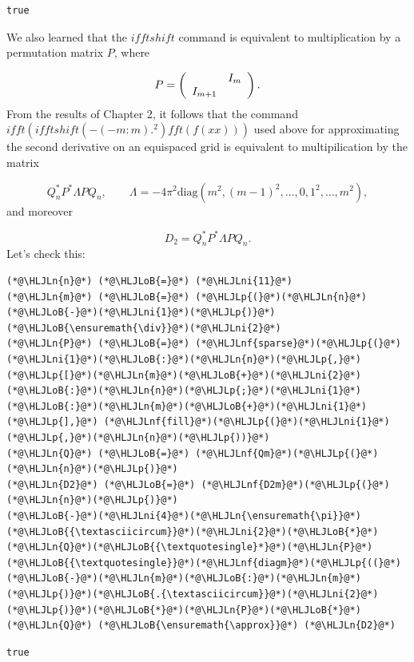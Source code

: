 \documentclass[12pt,a4paper]{article}
\newcommand{\HLJLn}[1]{#1}
\newcommand{\HLJLnf}[1]{\textcolor[RGB]{66,102,213}{#1}}
\newcommand{\HLJLni}[1]{\textcolor[RGB]{59,151,46}{#1}}
\newcommand{\HLJLoB}[1]{\textcolor[RGB]{102,102,102}{\textbf{#1}}}
\newcommand{\HLJLp}[1]{#1}
\begin{document}
\begin{lstlisting}
true
\end{lstlisting}


We also learned that the $ifftshift$ command is equivalent to multiplication by a permutation matrix $P$, where

\[
P = \left(
\begin{array}{c c}
   & I_{m} \\
I_{m+1} & 
\end{array}
\right).
\]
From the results of Chapter 2, it follows that the command $ifft(ifftshift(-(-m:m).^2)fft(f(xx)))$ used above for approximating the second derivative on an equispaced grid is equivalent to multipilication by the matrix

\[
Q_n^*P^*\Lambda PQ_n, \qquad \Lambda = -4\pi^2\mathrm{diag}(m^2, (m-1)^2, \ldots, 0, 1^2, \ldots, m^2),
\]
and moreover

\[
D_2 = Q_n^*P^*\Lambda PQ_n.
\]
Let's check this:


\begin{lstlisting}
(*@\HLJLn{n}@*) (*@\HLJLoB{=}@*) (*@\HLJLni{11}@*)
(*@\HLJLn{m}@*) (*@\HLJLoB{=}@*) (*@\HLJLp{(}@*)(*@\HLJLn{n}@*)(*@\HLJLoB{-}@*)(*@\HLJLni{1}@*)(*@\HLJLp{)}@*)(*@\HLJLoB{\ensuremath{\div}}@*)(*@\HLJLni{2}@*)
(*@\HLJLn{P}@*) (*@\HLJLoB{=}@*) (*@\HLJLnf{sparse}@*)(*@\HLJLp{(}@*)(*@\HLJLni{1}@*)(*@\HLJLoB{:}@*)(*@\HLJLn{n}@*)(*@\HLJLp{,}@*) (*@\HLJLp{[}@*)(*@\HLJLn{m}@*)(*@\HLJLoB{+}@*)(*@\HLJLni{2}@*)(*@\HLJLoB{:}@*)(*@\HLJLn{n}@*)(*@\HLJLp{;}@*)(*@\HLJLni{1}@*)(*@\HLJLoB{:}@*)(*@\HLJLn{m}@*)(*@\HLJLoB{+}@*)(*@\HLJLni{1}@*)(*@\HLJLp{],}@*) (*@\HLJLnf{fill}@*)(*@\HLJLp{(}@*)(*@\HLJLni{1}@*)(*@\HLJLp{,}@*)(*@\HLJLn{n}@*)(*@\HLJLp{))}@*)
(*@\HLJLn{Q}@*) (*@\HLJLoB{=}@*) (*@\HLJLnf{Qm}@*)(*@\HLJLp{(}@*)(*@\HLJLn{n}@*)(*@\HLJLp{)}@*)
(*@\HLJLn{D2}@*) (*@\HLJLoB{=}@*) (*@\HLJLnf{D2m}@*)(*@\HLJLp{(}@*)(*@\HLJLn{n}@*)(*@\HLJLp{)}@*)
(*@\HLJLoB{-}@*)(*@\HLJLni{4}@*)(*@\HLJLn{\ensuremath{\pi}}@*)(*@\HLJLoB{{\textasciicircum}}@*)(*@\HLJLni{2}@*)(*@\HLJLoB{*}@*)(*@\HLJLn{Q}@*)(*@\HLJLoB{{\textquotesingle}*}@*)(*@\HLJLn{P}@*)(*@\HLJLoB{{\textquotesingle}}@*)(*@\HLJLnf{diagm}@*)(*@\HLJLp{((}@*)(*@\HLJLoB{-}@*)(*@\HLJLn{m}@*)(*@\HLJLoB{:}@*)(*@\HLJLn{m}@*)(*@\HLJLp{)}@*)(*@\HLJLoB{.{\textasciicircum}}@*)(*@\HLJLni{2}@*)(*@\HLJLp{)}@*)(*@\HLJLoB{*}@*)(*@\HLJLn{P}@*)(*@\HLJLoB{*}@*)(*@\HLJLn{Q}@*) (*@\HLJLoB{\ensuremath{\approx}}@*) (*@\HLJLn{D2}@*)
\end{lstlisting}

\begin{lstlisting}
true
\end{lstlisting}
\end{document}
